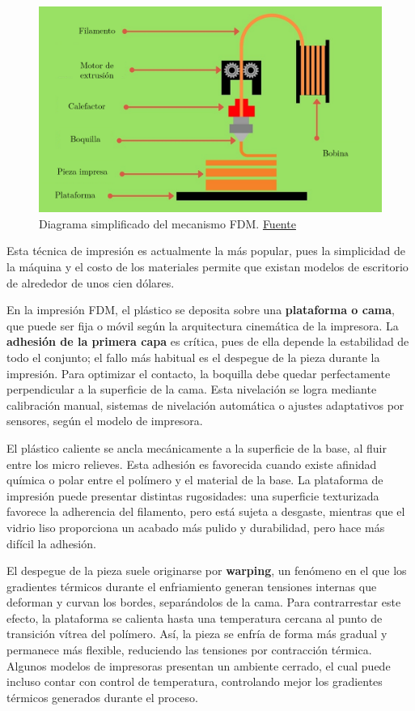 \begin{figure}[h!]
	\centering
	\includegraphics[width=0.8\linewidth]{imgs/3dpdiag.png}
	\caption{Diagrama simplificado del mecanismo FDM. \href{https://manufactur3dmag.com/working-fdm-3d-printing-technology/}{Fuente}}
	\label{3dpdiagfig}
\end{figure} 

Esta técnica de impresión es actualmente la más popular, pues la simplicidad de la máquina y el costo de los materiales permite que existan modelos de escritorio de alrededor de unos cien dólares.

En la impresión FDM, el plástico se deposita sobre una \textbf{plataforma o cama}, que puede ser fija o móvil según la arquitectura cinemática de la impresora. La \textbf{adhesión de la primera capa} es crítica, pues de ella depende la estabilidad de todo el conjunto; el fallo más habitual es el despegue de la pieza durante la impresión. Para optimizar el contacto, la boquilla debe quedar perfectamente perpendicular a la superficie de la cama. Esta nivelación se logra mediante calibración manual, sistemas de nivelación automática o ajustes adaptativos por sensores, según el modelo de impresora. 

El plástico caliente se ancla mecánicamente a la superficie de la base, al fluir entre los micro relieves. Esta adhesión es favorecida cuando existe afinidad química o polar entre el polímero y el material de la base. La plataforma de impresión puede presentar distintas rugosidades: una superficie texturizada favorece la adherencia del filamento, pero está sujeta a desgaste, mientras que el vidrio liso proporciona un acabado más pulido y durabilidad, pero hace más difícil la adhesión.

El despegue de la pieza suele originarse por \textbf{warping}, un fenómeno en el que los gradientes térmicos durante el enfriamiento generan tensiones internas que deforman y curvan los bordes, separándolos de la cama. Para contrarrestar este efecto, la plataforma se calienta hasta una temperatura cercana al punto de transición vítrea del polímero. Así, la pieza se enfría de forma más gradual y permanece más flexible, reduciendo las tensiones por contracción térmica. Algunos modelos de impresoras presentan un ambiente cerrado, el cual puede incluso contar con control de temperatura, controlando mejor los gradientes térmicos generados durante el proceso.


